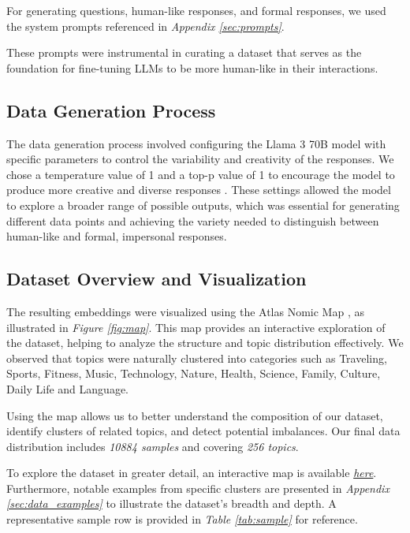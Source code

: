 \documentclass{article}
\begin{document}
For generating questions, human-like responses, and formal responses, we used the system prompts referenced in \textit{Appendix \ref{sec:prompts}}.

These prompts were instrumental in curating a dataset that serves as the foundation for fine-tuning LLMs to be more human-like in their interactions.
\setlength{\parskip}{0.2cm}
\vspace{-0.2cm}
\subsection{Data Generation Process}
The data generation process involved configuring the Llama 3 70B model with specific parameters to control the variability and
creativity of the responses. We chose a temperature value of 1 and a top-p value of 1 to encourage the model to
produce more creative and diverse responses \cite{peeperkorn2024temperaturecreativityparameterlarge}. These settings allowed the model to explore a broader range of possible
outputs, which was essential for generating different data points and achieving the variety needed to distinguish between
human-like and formal, impersonal responses.
\setlength{\parskip}{0.5cm}

\subsection{Dataset Overview and Visualization}
\setlength{\parskip}{0.2cm}

The resulting embeddings were visualized using the Atlas Nomic Map \cite{nomic}, as illustrated in \textit{Figure \ref{fig:map}}. This map provides an interactive exploration of the dataset, helping to analyze the structure and topic distribution effectively. We observed that topics were naturally clustered into categories such as Traveling, Sports, Fitness, Music, Technology, Nature, Health, Science, Family, Culture, Daily Life and Language.


Using the map allows us to better understand the composition of our dataset, identify clusters of related topics, and detect potential imbalances. Our final data distribution includes \textit{10884 samples} and covering \textit{256 topics}.

To explore the dataset in greater detail, an interactive map is available \href{https://atlas.nomic.ai/data/human-like-llms/human-like-dpo-dataset/map}{\textit{here}}. Furthermore, notable examples from specific clusters are presented in \textit{Appendix \ref{sec:data_examples}} to illustrate the dataset's breadth and depth. A representative sample row is provided in \textit{Table \ref{tab:sample}} for reference.
\end{document}
